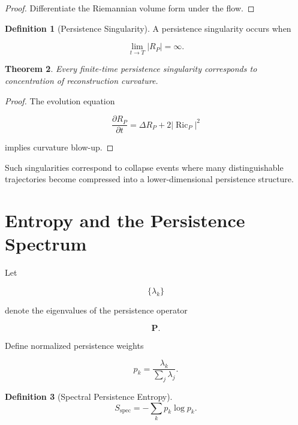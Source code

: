 \documentclass[12pt,oneside]{article}
\newtheorem{theorem}{Theorem}[section] \newtheorem{lemma}[theorem]{Lemma} \newtheorem{proposition}[theorem]{Proposition} \newtheorem{corollary}[theorem]{Corollary}
\theoremstyle{definition}
\newtheorem{definition}[theorem]{Definition} \newtheorem{axiom}[theorem]{Axiom} \newtheorem{remark}[theorem]{Remark} \newtheorem{example}[theorem]{Example}
\begin{document}
\begin{proof}

Differentiate the Riemannian volume form under the flow.

\end{proof}

\begin{definition}[Persistence Singularity]

A persistence singularity occurs when

\[
\lim_{t\to T}
|R_P|
=
\infty.
\]

\end{definition}

\begin{theorem}

Every finite-time persistence singularity corresponds to concentration of reconstruction curvature.

\end{theorem}

\begin{proof}

The evolution equation

\[
\frac{\partial R_P}{\partial t}
=
\Delta R_P
+
2|\operatorname{Ric}_P|^2
\]

implies curvature blow-up.

\end{proof}

Such singularities correspond to collapse events where many distinguishable trajectories become compressed into a lower-dimensional persistence structure.

\section{Entropy and the Persistence Spectrum}

Let

\[
\{\lambda_k\}
\]

denote the eigenvalues of the persistence operator

\[
\mathbf P.
\]

Define normalized persistence weights

\[
p_k
=
\frac{\lambda_k}
{\sum_j \lambda_j}.
\]

\begin{definition}[Spectral Persistence Entropy]

\[
S_{\mathrm{spec}}
=
-
\sum_k
p_k
\log p_k.
\]

\end{definition}
\end{document}
